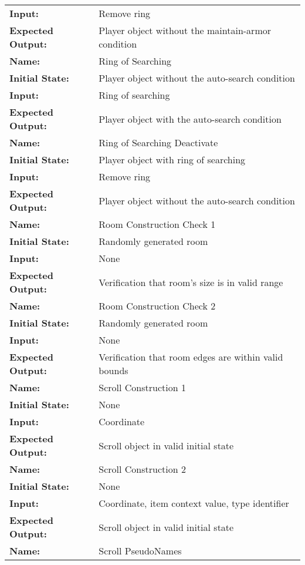 \documentclass[12pt, titlepage]{article}
\begin{document}
\begin{center}
\begin{longtable}{ l | p{10cm} }
				\textbf{Input:} & Remove ring\\
				\textbf{Expected Output:} & Player object without the maintain-armor condition\\
				\hline
				\textbf{Name:} & Ring of Searching\\
				\textbf{Initial State:} & Player object without the auto-search condition\\
				\textbf{Input:} & Ring of searching\\
				\textbf{Expected Output:} & Player object with the auto-search condition\\
				\hline
				\textbf{Name:} & Ring of Searching Deactivate\\
				\textbf{Initial State:} & Player object with ring of searching\\
				\textbf{Input:} & Remove ring\\
				\textbf{Expected Output:} & Player object without the auto-search condition\\
				\hline
				\textbf{Name:} & Room Construction Check 1\\
				\textbf{Initial State:} & Randomly generated room\\
				\textbf{Input:} & None\\
				\textbf{Expected Output:} & Verification that room's size is in valid range\\
				\hline
				\textbf{Name:} & Room Construction Check 2\\
				\textbf{Initial State:} & Randomly generated room\\
				\textbf{Input:} & None\\
				\textbf{Expected Output:} & Verification that room edges are within valid bounds\\
				\hline
				\textbf{Name:} & Scroll Construction 1\\
				\textbf{Initial State:} & None\\
				\textbf{Input:} & Coordinate\\
				\textbf{Expected Output:} & Scroll object in valid initial state\\
				\hline
				\textbf{Name:} & Scroll Construction 2\\
				\textbf{Initial State:} & None\\
				\textbf{Input:} & Coordinate, item context value, type identifier\\
				\textbf{Expected Output:} & Scroll object in valid initial state\\
				\hline
				\textbf{Name:} & Scroll PseudoNames\\

\end{longtable}
\end{center}
\end{document}
